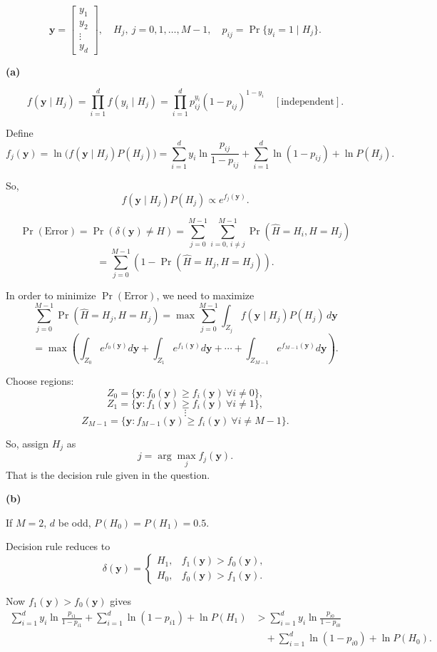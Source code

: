 \documentclass[12pt,a4paper,onecolumn]{exam}
\begin{document}
\begin{solution}

\[
\mathbf{y}=\begin{bmatrix}y_1\\y_2\\\vdots\\y_d\end{bmatrix},
\quad H_j,\ j=0,1,\dots,M-1,
\quad p_{ij}=\Pr\{y_i=1\mid H_j\}.
\]

\textbf{(a)}

\[
f(\mathbf{y}\mid H_j)=\prod_{i=1}^{d} f(y_i\mid H_j)
=\prod_{i=1}^{d} p_{ij}^{y_i}(1-p_{ij})^{1-y_i}
\quad [\text{independent}].
\]

Define
\[
f_j(\mathbf{y})=\ln\big(f(\mathbf{y}\mid H_j)P(H_j)\big)
=\sum_{i=1}^{d} y_i\ln\frac{p_{ij}}{1-p_{ij}}
+\sum_{i=1}^{d}\ln(1-p_{ij})
+\ln P(H_j).
\]

So,
\[
f(\mathbf{y}\mid H_j)P(H_j)\propto e^{f_j(\mathbf{y})}.
\]

\[
\Pr(\text{Error})=\Pr(\delta(\mathbf{y})\ne H)
=\sum_{j=0}^{M-1}\sum_{i=0,\,i\ne j}^{M-1}\Pr(\hat{H}=H_i, H=H_j)
\]
\[
=\sum_{j=0}^{M-1}\left(1-\Pr(\hat{H}=H_j, H=H_j)\right).
\]

In order to minimize $\Pr(\text{Error})$, we need to maximize
\[
\sum_{j=0}^{M-1}\Pr(\hat{H}=H_j, H=H_j)
=\max\sum_{j=0}^{M-1}\int_{Z_j} f(\mathbf{y}\mid H_j)P(H_j)\,d\mathbf{y}
\]
\[
=\max\left(\int_{Z_0}e^{f_0(\mathbf{y})}d\mathbf{y}+\int_{Z_1}e^{f_1(\mathbf{y})}d\mathbf{y}+\cdots+\int_{Z_{M-1}}e^{f_{M-1}(\mathbf{y})}d\mathbf{y}\right).
\]

Choose regions:
\[
Z_0=\{\mathbf{y}: f_0(\mathbf{y})\ge f_i(\mathbf{y})\ \forall i\ne 0\},
\]
\[
Z_1=\{\mathbf{y}: f_1(\mathbf{y})\ge f_i(\mathbf{y})\ \forall i\ne 1\},
\]
\[
\vdots
\]
\[
Z_{M-1}=\{\mathbf{y}: f_{M-1}(\mathbf{y})\ge f_i(\mathbf{y})\ \forall i\ne M-1\}.
\]

So, assign $H_j$ as
\[
j=\arg\max_j f_j(\mathbf{y}).
\]
That is the decision rule given in the question.

\textbf{(b)}

If $M=2$, $d$ be odd, $P(H_0)=P(H_1)=0.5$.

Decision rule reduces to
\[
\delta(\mathbf{y})=
\begin{cases}
H_1, & f_1(\mathbf{y})>f_0(\mathbf{y}),\\
H_0, & f_0(\mathbf{y})>f_1(\mathbf{y}).
\end{cases}
\]

Now $f_1(\mathbf{y})>f_0(\mathbf{y})$ gives
\[
\begin{aligned}
\sum_{i=1}^{d} y_i\ln\frac{p_{i1}}{1-p_{i1}}
+\sum_{i=1}^{d}\ln(1-p_{i1})
+\ln P(H_1)
&>
\sum_{i=1}^{d} y_i\ln\frac{p_{i0}}{1-p_{i0}}\\
&\quad
+\sum_{i=1}^{d}\ln(1-p_{i0})
+\ln P(H_0).
\end{aligned}
\]


\end{solution}
\end{document}
